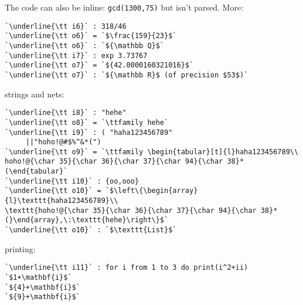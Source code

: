 \documentclass[12pt,a4paper]{amsart}
\begin{document}
The code can also be inline: \lstinline[language=Macaulay2]!gcd(1300,75)! but isn't parsed.
More:
\begin{lstlisting}[language=Macaulay2output]
`\underline{\tt i6}` : 318/46
`\underline{\tt o6}` = `$\frac{159}{23}$`
`\underline{\tt o6}` : `${\mathbb Q}$`
`\underline{\tt i7}` : exp 3.73767
`\underline{\tt o7}` = `${42.0000160321016}$`
`\underline{\tt o7}` : `${\mathbb R}$ (of precision $53$)`
\end{lstlisting}
strings and nets:
\begin{lstlisting}[language=Macaulay2output]
`\underline{\tt i8}` : "hehe"
`\underline{\tt o8}` = `\ttfamily hehe`
`\underline{\tt i9}` : ( "haha123456789"
     ||"hoho!@#$%^&*(")
`\underline{\tt o9}` = `\ttfamily \begin{tabular}[t]{l}haha123456789\\
hoho!@{\char 35}{\char 36}{\char 37}{\char 94}{\char 38}*(\end{tabular}`
`\underline{\tt i10}` : {oo,ooo}
`\underline{\tt o10}` = `$\left\{\begin{array}{l}\texttt{haha123456789}\\
\texttt{hoho!@{\char 35}{\char 36}{\char 37}{\char 94}{\char 38}*(}\end{array},\:\texttt{hehe}\right\}$`
`\underline{\tt o10}` : `$\texttt{List}$`
\end{lstlisting}
printing:
\begin{lstlisting}[language=Macaulay2output]
`\underline{\tt i11}` : for i from 1 to 3 do print(i^2+ii)
`$1+\mathbf{i}$`
`${4}+\mathbf{i}$`
`${9}+\mathbf{i}$`
\end{lstlisting}
\end{document}

